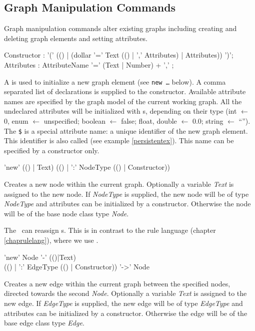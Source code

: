 \subsection{Graph Manipulation Commands}
\label{mani}
Graph manipulation commands alter existing graphs including creating and deleting graph elements and setting attributes.

\begin{rail}
  Constructor : '(' (() | (dollar '=' Text (() | ',' Attributes) | Attributes)) ')';
  Attributes : AttributeName '=' (Text | Number) + ',' ;
\end{rail}\indexmain{\texttt{\$}}
A  is used to initialize a new graph element (see \texttt{new \dots} below). A comma separated list of  declarations is supplied to the constructor. Available attribute names are specified by the graph model of the current working graph. All the undeclared attributes will be initialized with s, depending on their type (int $\leftarrow$ 0, enum $\leftarrow$ unspecified; boolean $\leftarrow$ false; float, double $\leftarrow$ 0.0; string $\leftarrow$ ``'').\\
The \texttt{\$} is a special attribute name: a unique identifier of the new graph element. This identifier is also called  (see example \ref{persistentex}). This name can be specified by a constructor only.

\begin{rail}
  'new' (() | Text) (() | ':' NodeType (() | Constructor))
\end{rail}
Creates a new node within the current graph. Optionally a variable \emph{Text} is assigned to the new node. If \emph{NodeType} is supplied, the new node will be of type \emph{NodeType} and attributes can be initialized by a constructor. Otherwise the node will be of the base node class type \emph{Node}.
\begin{note}
The \GrShell\ can reassign s. 
This is in contrast to the rule language (chapter \ref{chaprulelang}), where we use \emph{}.
\end{note}

\begin{rail}
  'new' Node '-' (()|Text) \\ (() | ':' EdgeType (() | Constructor)) '->' Node
\end{rail}
Creates a new edge within the current graph between the specified nodes, directed towards the second \emph{Node}. Optionally a variable \emph{Text} is assigned to the new edge. If \emph{EdgeType} is supplied, the new edge will be of type \emph{EdgeType} and attributes can be initialized by a constructor. Otherwise the edge will be of the base edge class type \emph{Edge}.

